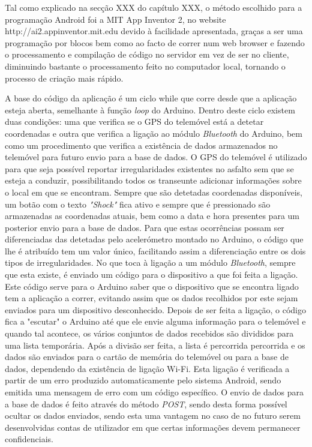 Tal como explicado na secção XXX do capítulo XXX, o método escolhido para a programação Android foi a MIT App Inventor 2, no website http://ai2.appinventor.mit.edu devido à facilidade apresentada, graças a ser uma programação por blocos bem como ao facto de correr num web browser e fazendo o processamento e compilação de código no servidor em vez de ser no cliente, diminuindo bastante o processamento feito no computador local, tornando o processo de criação mais rápido.

A base do código da aplicação é um ciclo while que corre desde que a aplicação esteja aberta, semelhante à função \emph{loop} do Arduino.
Dentro deste ciclo existem duas condições: uma que verifica se o GPS do telemóvel está a detetar coordenadas e outra que verifica a ligação ao módulo \emph{Bluetooth} do Arduino, bem como um procedimento que verifica a existência de dados armazenados no telemóvel para futuro envio para a base de dados.
O GPS do telemóvel é utilizado para que seja possível reportar irregularidades existentes no asfalto sem que se esteja a conduzir, possibilitando todos os transeunte adicionar informações sobre o local em que se encontram.
Sempre que são detetadas coordenadas disponíveis, um botão com o texto \emph{"Shock"} fica ativo e sempre que é pressionado são armazenadas as coordenadas atuais, bem como a data e hora presentes para um posterior envio para a base de dados.
Para que estas ocorrências possam ser diferenciadas das detetadas pelo acelerómetro montado no Arduino, o código que lhe é atribuído tem um valor único, facilitando assim a diferenciação entre os dois tipos de irregularidades.
No que toca à ligação a um módulo \emph{Bluetooth}, sempre que esta existe, é enviado um código para o dispositivo a que foi feita a ligação.
Este código serve para o Arduino saber que o dispositivo que se encontra ligado tem a aplicação a correr, evitando assim que os dados recolhidos por este sejam enviados para um dispositivo desconhecido.
Depois de ser feita a ligação, o código fica a "escutar" o Arduino até que ele envie alguma informação para o telemóvel e quando tal acontece, os vários conjuntos de dados  recebidos são divididos para uma lista temporária.
Após a divisão ser feita, a lista é percorrida percorrida e os dados são enviados para o cartão de memória do telemóvel ou para a base de dados, dependendo da existência de ligação Wi-Fi.
Esta ligação é verificada a partir de um erro produzido automaticamente pelo sistema Android, sendo emitida uma mensagem de erro com um código específico.
O envio de dados para a base de dados é feito através do método \emph{POST}, sendo desta forma possível ocultar os dados enviados, sendo esta uma vantagem no caso de no futuro serem desenvolvidas contas de utilizador em que certas informações devem permanecer confidenciais.
